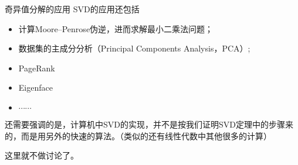 
\begin{frame}

\begin{block}{奇异值分解的应用}
SVD的应用还包括
\begin{itemize}
\item 计算Moore–Penrose伪逆，进而求解最小二乘法问题；
\item 数据集的主成分分析（Principal Components Analysis，PCA）;
\item PageRank
\item Eigenface
\item $\cdots\cdots$
\end{itemize}
\end{block}

\vspace{1em}
\pause

还需要强调的是，计算机中SVD的实现，并不是按我们证明SVD定理中的步骤来的，而是用另外的快速的算法。（类似的还有线性代数中其他很多的计算）

这里就不做讨论了。

\end{frame}



